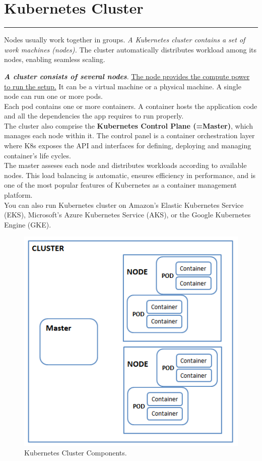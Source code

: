 \documentclass{article}
\begin{document}
\newpage
\section{Kubernetes Cluster}
\noindent
{\color{red} \rule{\linewidth}{0.5mm}}
\begin{tcolorbox}[colback=red!5!white, colframe=red!50!black,title=What is a Kubernetes Cluster?]
   Nodes usually work together in groups. \textit{A Kubernetes cluster contains a set of work machines (nodes).} The cluster automatically distributes workload among its nodes, enabling seamless scaling.

\end{tcolorbox}
\textbf{\textit{A cluster consists of several nodes}}. \underline{The node provides the compute power to run the setup.} It can be a virtual machine or a physical machine. A single node can run one or more pods. \\

Each pod contains one or more containers. A container hosts the application code and all the dependencies the app requires to run properly. \\

The cluster also comprise the \textbf{Kubernetes Control Plane (=Master)}, which manages each node within it. The control panel is a container orchestration layer where K8s exposes the API and interfaces for defining, deploying and managing container's life cycles. \\

The master asseses each node and distributes workloads according to available nodes. This load balancing is automatic, ensures efficiency in performance, and is one of the most popular features of Kubernetes as a container management platform. \\

You can also run Kubernetes cluster on Amazon's Elastic Kubernetes Service (EKS), Microsoft's Azure Kubernetes Service (AKS), or the Google Kubernetes Engine (GKE). \\
\begin{figure}
\centering
\includegraphics[width=0.5\linewidth]{k8sDiagrams/K8sCluster0.png}
\caption{\label{fig:k8sClusterComponents}Kubernetes Cluster Components.}
\end{figure} 
\end{document}
